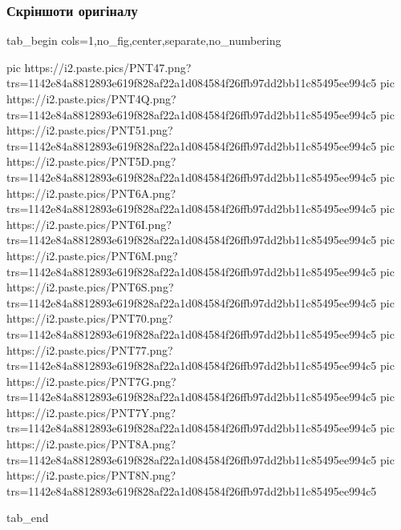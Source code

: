  
 
 
 
 

\subsubsection{Скріншоти оригіналу}

\ifcmt
  tab_begin cols=1,no_fig,center,separate,no_numbering

     pic https://i2.paste.pics/PNT47.png?trs=1142e84a8812893e619f828af22a1d084584f26ffb97dd2bb11c85495ee994c5
		 pic https://i2.paste.pics/PNT4Q.png?trs=1142e84a8812893e619f828af22a1d084584f26ffb97dd2bb11c85495ee994c5
		 pic https://i2.paste.pics/PNT51.png?trs=1142e84a8812893e619f828af22a1d084584f26ffb97dd2bb11c85495ee994c5
		 pic https://i2.paste.pics/PNT5D.png?trs=1142e84a8812893e619f828af22a1d084584f26ffb97dd2bb11c85495ee994c5
		 pic https://i2.paste.pics/PNT6A.png?trs=1142e84a8812893e619f828af22a1d084584f26ffb97dd2bb11c85495ee994c5
		 pic https://i2.paste.pics/PNT6I.png?trs=1142e84a8812893e619f828af22a1d084584f26ffb97dd2bb11c85495ee994c5
		 pic https://i2.paste.pics/PNT6M.png?trs=1142e84a8812893e619f828af22a1d084584f26ffb97dd2bb11c85495ee994c5
		 pic https://i2.paste.pics/PNT6S.png?trs=1142e84a8812893e619f828af22a1d084584f26ffb97dd2bb11c85495ee994c5
		 pic https://i2.paste.pics/PNT70.png?trs=1142e84a8812893e619f828af22a1d084584f26ffb97dd2bb11c85495ee994c5
		 pic https://i2.paste.pics/PNT77.png?trs=1142e84a8812893e619f828af22a1d084584f26ffb97dd2bb11c85495ee994c5
		 pic https://i2.paste.pics/PNT7G.png?trs=1142e84a8812893e619f828af22a1d084584f26ffb97dd2bb11c85495ee994c5
		 pic https://i2.paste.pics/PNT7Y.png?trs=1142e84a8812893e619f828af22a1d084584f26ffb97dd2bb11c85495ee994c5
		 pic https://i2.paste.pics/PNT8A.png?trs=1142e84a8812893e619f828af22a1d084584f26ffb97dd2bb11c85495ee994c5
		 pic https://i2.paste.pics/PNT8N.png?trs=1142e84a8812893e619f828af22a1d084584f26ffb97dd2bb11c85495ee994c5

  tab_end
\fi
